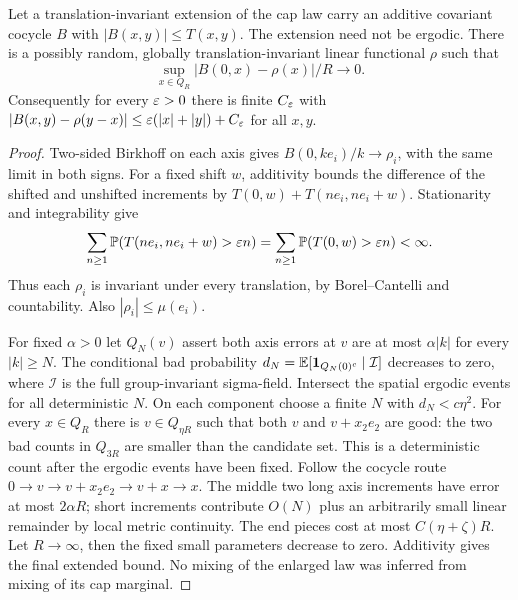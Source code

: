 \begin{lemma}\label{lem:cocycle}
Let a translation-invariant extension of the cap law carry an additive
covariant cocycle $B$ with $|B(x,y)|\le T(x,y)$. The extension need not be
ergodic. There is a possibly random, globally translation-invariant linear
functional $\rho$ such that
\[
 \sup_{x\in Q_R}|B(0,x)-\rho(x)|/R\longrightarrow0.
\]
Consequently for every $\varepsilon>0$ there is finite $C_\varepsilon$ with
$|B(x,y)-\rho(y-x)|\le\varepsilon(|x|+|y|)+C_\varepsilon$ for all $x,y$.
\end{lemma}
\begin{proof}
Two-sided Birkhoff on each axis gives $B(0,ke_i)/k\to\rho_i$, with the
same limit in both signs. For a fixed shift $w$, additivity bounds the
difference of the shifted and unshifted increments by
$T(0,w)+T(ne_i,ne_i+w)$. Stationarity and integrability give
\[
 \sum_{n\ge1}\mathbb P(T(ne_i,ne_i+w)>\varepsilon n)
 =\sum_{n\ge1}\mathbb P(T(0,w)>\varepsilon n)<\infty.
\]
Thus each $\rho_i$ is invariant under every translation, by Borel--Cantelli
and countability. Also $|\rho_i|\le\mu(e_i)$.

For fixed $\alpha>0$ let $Q_N(v)$ assert both axis errors at $v$ are at
most $\alpha|k|$ for every $|k|\ge N$. The conditional bad probability
$d_N=\mathbb E[\mathbf1_{Q_N(0)^c}\mid\mathcal I]$ decreases to zero, where
$\mathcal I$ is the full group-invariant sigma-field. Intersect the spatial
ergodic events for all deterministic $N$. On each component choose a finite
$N$ with $d_N<c\eta^2$. For every $x\in Q_R$ there is
$v\in Q_{\eta R}$ such that both $v$ and $v+x_2e_2$ are good: the two bad
counts in $Q_{3R}$ are smaller than the candidate set. This is a deterministic
count after the ergodic events have been fixed.
Follow the cocycle route
$0\to v\to v+x_2e_2\to v+x\to x$. The middle two long axis increments
have error at most $2\alpha R$; short increments contribute $O(N)$ plus
an arbitrarily small linear remainder by local metric continuity. The end
pieces cost at most $C(\eta+\zeta)R$. Let $R\to\infty$, then the fixed
small parameters decrease to zero. Additivity gives the final extended bound.
No mixing of the enlarged law was inferred from mixing of its cap marginal.
\end{proof}
